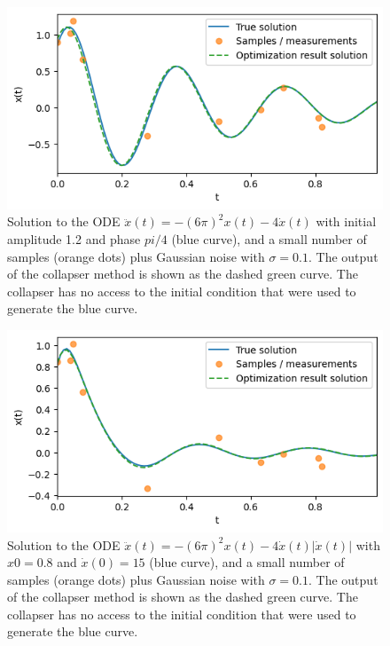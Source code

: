 \documentclass{article}
\begin{document}
\begin{figure}
\includegraphics{images/results/fit_damped_sho.png}
\centering
\caption{
Solution to the ODE $\ddot{x}(t) = - (6\pi)^2 x(t) - 4 \dot{x}(t)$ with initial amplitude 1.2 and phase $pi/4$ (blue curve), and a small number of samples (orange dots) plus Gaussian noise with $\sigma = 0.1$.
The output of the collapser method is shown as the dashed green curve.
The collapser has no access to the initial condition that were used to generate the blue curve.
}
\label{fig:fit_damped_sho}
\end{figure}

\begin{figure}
\includegraphics{images/results/fit_qd_osc.png}
\centering
\caption{
Solution to the ODE $\ddot{x}(t) = - (6\pi)^2 x(t) - 4 \dot{x}(t) \left| \dot{x}(t) \right|$ with $x{0} = 0.8$ and $\dot{x}(0) = 15$ (blue curve), and a small number of samples (orange dots) plus Gaussian noise with $\sigma = 0.1$.
The output of the collapser method is shown as the dashed green curve.
The collapser has no access to the initial condition that were used to generate the blue curve.
}
\label{fig:fit_qd_osc}
\end{figure}
\end{document}
